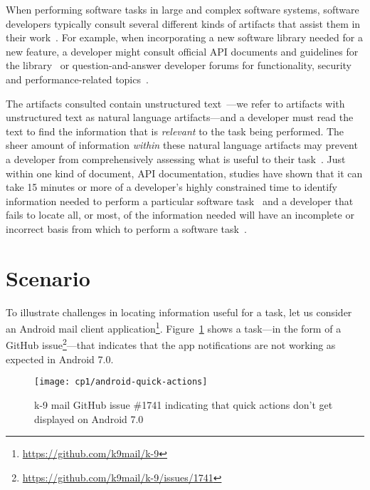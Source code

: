 

When performing software tasks in large and complex software systems, software developers typically consult several different kinds of artifacts that assist them in their work~\cite{Starke2009, Meyer2017}. For example, 
when incorporating a new software library needed for a new feature, a developer might consult official API documents and guidelines for the library~\cite{robillard2011field, umarji2008archetypal} or 
 question-and-answer developer forums for functionality, security and performance-related topics~\cite{parnin2012, silva2019}.



The artifacts consulted
contain unstructured text~\cite{Bavota2016}---we refer to artifacts with unstructured text as natural language artifacts---and 
a developer must read the text to find the information that is \textit{relevant} to the task being performed. 
The sheer amount of information \textit{within} these natural language artifacts may prevent a developer from comprehensively assessing what is useful to their task~\cite{Murphy2005}.
 Just within one kind of document, API
documentation, studies have shown that it can take 15 minutes or more
of a developer's highly constrained time to identify 
information needed to perform a particular software task~\cite{endrikat2014, Meyer2017}
and a developer that fails to locate all, or most, of the information needed
 will have an incomplete or incorrect basis from which to perform a software task~\cite{Murphy2005}.



 \section{Scenario}
 \label{cp1:example}
 
 
 
 
 To illustrate challenges in locating information useful for a task, let us consider an  Android mail client application\footnote{\url{https://github.com/k9mail/k-9}}.
 Figure~\ref{fig:android-notifications-task} shows a task---in the form of a GitHub issue\footnote{\url{https://github.com/k9mail/k-9/issues/1741}}---that indicates that the app notifications 
 are not working as expected in Android 7.0. 
 
 \medskip
 \begin{figure}[h!]
     \centering
     \texttt{[image: cp1/android-quick-actions]}
     \caption{k-9 mail GitHub issue \#1741 indicating that quick actions don't get displayed on Android 7.0}
     \label{fig:android-notifications-task}
 \end{figure}
 
